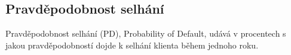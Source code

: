 \documentclass[a4paper,12pt]{report}
\theoremstyle{definition} \newtheorem{definice}[veta]{Definice}
\theoremstyle{remark}
\begin{document}
\subsection{Pravděpodobnost selhání}

Pravděpodobnost selhání (PD), Probability of Default, udává v procentech s jakou pravděpodobností dojde k selhání klienta během jednoho roku.









\nocite{}  %

%


\end{document}
